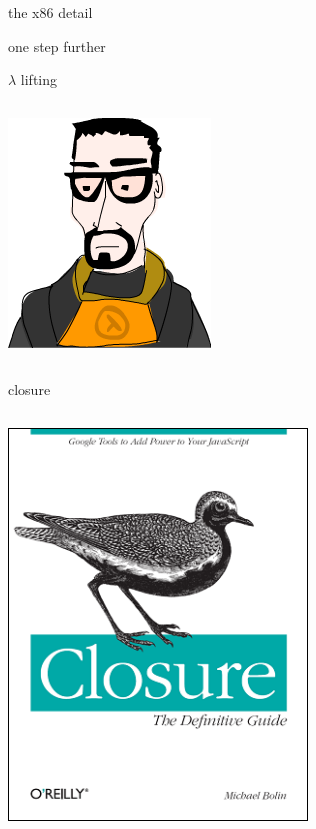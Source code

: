 \documentclass{beamer}
\begin{document}
\begin{frame}{the x86 detail}
  
  \vfill
  
\end{frame}

\begin{frame}{one step further}
  
\end{frame}

\begin{frame}{$\lambda$ lifting}
  \begin{columns}
    \begin{column}[b]{3.8cm}
      \includegraphics[scale=0.4]{lambda}
    \end{column}
    \begin{column}[b]{6.2cm}
      
      
    \end{column}
  \end{columns}
\end{frame}

\begin{frame}{closure}
  \begin{columns}
    \begin{column}[b]{3.8cm}
      \includegraphics[scale=0.3]{closure}
    \end{column}
    \begin{column}[b]{6.2cm}
      
    \end{column}
  \end{columns}
\end{frame}
\end{document}
